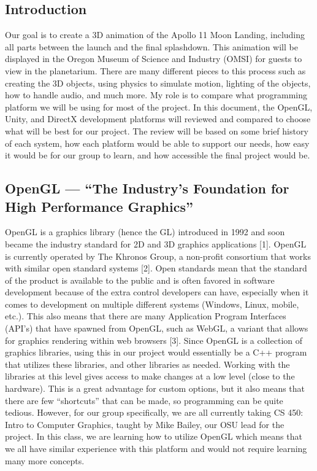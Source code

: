 \documentclass[onecolumn, draftclsnofoot,10pt, compsoc]{IEEEtran}
\begin{document}
\newpage
{}
\tableofcontents
\clearpage

\subsection{Introduction}
Our goal is to create a 3D animation of the Apollo 11 Moon Landing, including all parts between the launch and the final splashdown. This animation will be displayed in the Oregon Museum of Science and Industry (OMSI) for guests to view in the planetarium. There are many different pieces to this process such as creating the 3D objects, using physics to simulate motion, lighting of the objects, how to handle audio, and much more. My role is to compare what programming platform we will be using for most of the project. In this document, the OpenGL, Unity, and DirectX development platforms will reviewed and compared to choose what will be best for our project. The review will be based on some brief history of each system, how each platform would be able to support our needs, how easy it would be for our group to learn, and how accessible the final project would be.

\subsection{OpenGL --- ``The Industry's Foundation for High Performance Graphics''}
OpenGL is a graphics library (hence the GL) introduced in 1992 and soon became the industry standard for 2D and 3D graphics applications [1]. OpenGL is currently operated by The Khronos Group, a non-profit consortium that works with similar open standard systems [2].  Open standards mean that the standard of the product is available to the public and is often favored in software development because of the extra control developers can have, especially when it comes to development on multiple different systems (Windows, Linux, mobile, etc.). This also means that there are many Application Program Interfaces (API's) that have spawned from OpenGL, such as WebGL, a variant that allows for graphics rendering within web browsers [3].
\newline
\newline
Since OpenGL is a collection of graphics libraries, using this in our project would essentially be a C++ program that utilizes these libraries, and other libraries as needed. Working with the libraries at this level gives access to make changes at a low level (close to the hardware). This is a great advantage for custom options, but it also means that there are few “shortcuts” that can be made, so programming can be quite tedious. However, for our group specifically, we are all currently taking CS 450: Intro to Computer Graphics, taught by Mike Bailey, our OSU lead for the project. In this class, we are learning how to utilize OpenGL which means that we all have similar experience with this platform and would not require learning many more concepts. 
\end{document}
